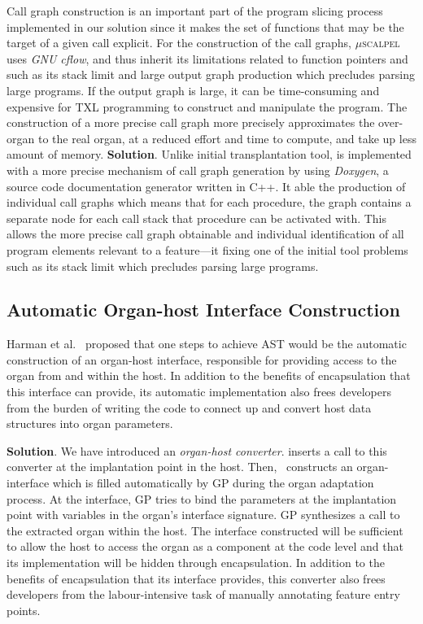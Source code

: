 Call graph construction is an important part of the program slicing process implemented in our solution since it makes the set of functions that may be the target of a given call explicit. For the construction of the call graphs, $\mu$\textsc{scalpel} uses \emph{GNU cflow}, and thus inherit its limitations related to function pointers and such as its stack limit and large output graph production which precludes parsing large programs. If the output graph is large, it can be time-consuming and expensive for TXL programming to construct and manipulate the program. The construction of a more precise call graph more precisely approximates the over-organ to the real organ, at a reduced effort and time to compute, and take up less amount of memory.  
\textbf{Solution}. Unlike initial transplantation tool, \autoscalpel is implemented with a more precise mechanism of call graph generation by using \emph{Doxygen}\cite{Doxygen2018}, a source code documentation generator written in C++. It able the production of individual call graphs which means that for each procedure, the graph contains a separate node for each call stack that procedure can be activated with. This allows the more precise call graph obtainable and individual identification of all program elements relevant to a feature—it fixing one of the initial tool problems such as its stack limit which precludes parsing large programs. 

\subsection{Automatic Organ-host Interface Construction} 

Harman et al.~\cite{Harman2013} proposed that one steps to achieve AST would be the automatic construction of an organ-host interface, responsible for providing access to the organ from and within the host.  In addition to the benefits of encapsulation that this interface can provide, its automatic implementation also frees developers from the burden of writing the code to connect up and convert host data structures into organ parameters. 

\textbf{Solution}. We have introduced an \emph{organ-host converter}.  \autoscalpel inserts a call to this converter at the implantation point in the host. Then, \autoscalpel~constructs an organ-interface which is filled automatically by GP during the organ adaptation process. At the interface, GP tries to bind the parameters at the implantation point with variables in the organ's interface signature. GP synthesizes a call to the extracted organ within the host. The interface constructed will be sufficient to allow the host to access the organ as a component at the code level and that its implementation will be hidden through encapsulation. In addition to the benefits of encapsulation that its interface provides, this converter also frees developers from the labour-intensive task of manually annotating feature entry points. 
